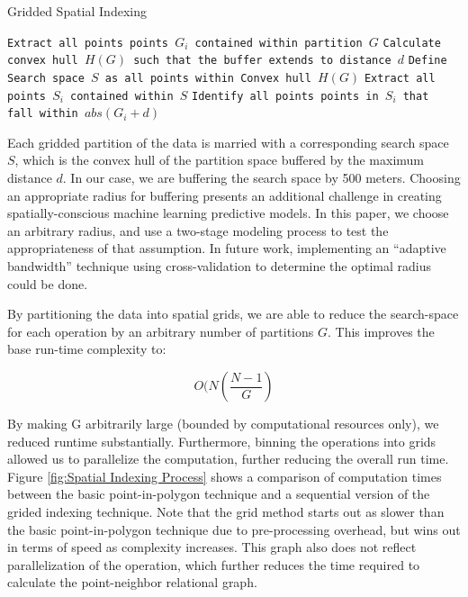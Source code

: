 \documentclass[12pt,]{article}
\begin{document}
\begin{algorithm}
  \caption{Gridded Spatial Indexing}
  \label{alg:spatial1}
  \begin{algorithmic}[1]
        \State \texttt{Extract all points points $G_i$ contained within partition $G$}
        \State \texttt{Calculate convex hull $H(G)$ such that the buffer extends to distance $d$}
        \State \texttt{Define Search space $S$ as all points within Convex hull $H(G)$}
        \State \texttt{Extract all points $S_i$ contained within $S$}
            \State \texttt{Identify all points points in $S_i$ that fall within $abs(G_i+d)$}
        \EndFor
      \EndFor
  \end{algorithmic}
\end{algorithm}

\noindent Each gridded partition of the data is married with a
corresponding search space \(S\), which is the convex hull of the
partition space buffered by the maximum distance \(d\). In our case, we
are buffering the search space by 500 meters. Choosing an appropriate
radius for buffering presents an additional challenge in creating
spatially-conscious machine learning predictive models. In this paper,
we choose an arbitrary radius, and use a two-stage modeling process to
test the appropriateness of that assumption. In future work,
implementing an ``adaptive bandwidth'' technique using cross-validation
to determine the optimal radius could be done.

By partitioning the data into spatial grids, we are able to reduce the
search-space for each operation by an arbitrary number of partitions
\(G\). This improves the base run-time complexity to:

\[
O(N(\frac{N-1}{G})
\]

\noindent By making G arbitrarily large (bounded by computational
resources only), we reduced runtime substantially. Furthermore, binning
the operations into grids allowed us to parallelize the computation,
further reducing the overall run time. Figure
\ref{fig:Spatial Indexing Process} shows a comparison of computation
times between the basic point-in-polygon technique and a sequential
version of the grided indexing technique. Note that the grid method
starts out as slower than the basic point-in-polygon technique due to
pre-processing overhead, but wins out in terms of speed as complexity
increases. This graph also does not reflect parallelization of the
operation, which further reduces the time required to calculate the
point-neighbor relational graph.
\end{document}
